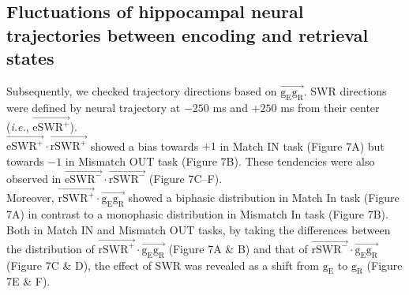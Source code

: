 \subsection{Fluctuations of hippocampal neural trajectories between encoding and retrieval states}
Subsequently, we checked trajectory directions based on $\overrightarrow{\mathrm{g_{E}g_{R}}}$. SWR directions were defined by neural trajectory at $-250$ ms and $+250$ ms from their center (\textit{i.e.}, $\overrightarrow{\mathrm{eSWR^+}}$).
\\
\indent
$\overrightarrow{\mathrm{eSWR^+}}\cdot\overrightarrow{\mathrm{rSWR^+}}$ showed a bias towards $+1$ in Match IN task (Figure 7A) but towards $-1$ in Mismatch OUT task (Figure 7B). These tendencies were also observed in $\overrightarrow{\mathrm{eSWR^-}}\cdot\overrightarrow{\mathrm{rSWR^-}}$ (Figure 7C--F).
\\
\indent
Moreover, $\overrightarrow{\mathrm{rSWR^+}}\cdot\overrightarrow{\mathrm{g_{E}g_{R}}}$ showed a biphasic distribution in Match In task (Figure 7A) in contrast to a monophasic distribution in Mismatch In task (Figure 7B).
\\
\indent
Both in Match IN and Mismatch OUT tasks, by taking the differences between the distribution of $\overrightarrow{\mathrm{rSWR^+}}\cdot\overrightarrow{\mathrm{g_{E}g_{R}}}$ (Figure 7A \& B) and that of $\overrightarrow{\mathrm{rSWR^-}}\cdot\overrightarrow{\mathrm{g_{E}g_{R}}}$ (Figure 7C \& D), the effect of SWR was revealed as a shift from $\mathrm{g_{E}}$ to $\mathrm{g_{R}}$ (Figure 7E \& F).
\label{sec:results}
